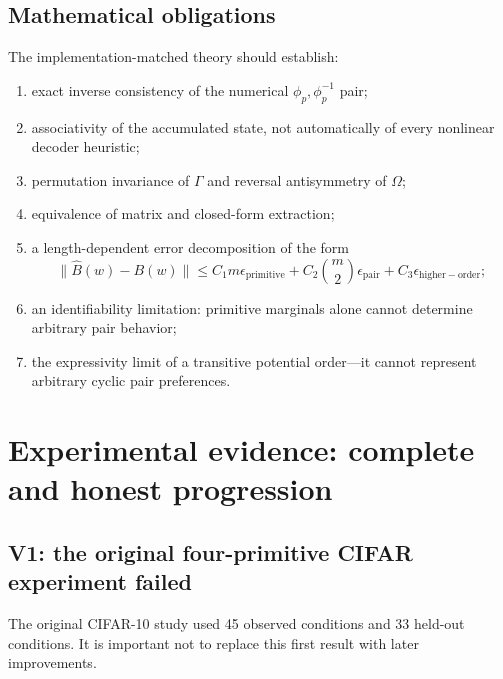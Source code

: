 \documentclass[11pt,a4paper]{article}
\begin{document}
\subsection{Mathematical obligations}

The implementation-matched theory should establish:
\begin{enumerate}
  \item exact inverse consistency of the numerical $\phi_p,\phi_p^{-1}$ pair;
  \item associativity of the accumulated state, not automatically of every
  nonlinear decoder heuristic;
  \item permutation invariance of $\Gamma$ and reversal antisymmetry of
  $\Omega$;
  \item equivalence of matrix and closed-form extraction;
  \item a length-dependent error decomposition of the form
  \[
  \|\widehat B(w)-B(w)\|
  \le C_1m\epsilon_{\mathrm{primitive}}
  +C_2\binom{m}{2}\epsilon_{\mathrm{pair}}
  +C_3\epsilon_{\mathrm{higher-order}};
  \]
  \item an identifiability limitation: primitive marginals alone cannot
  determine arbitrary pair behavior;
  \item the expressivity limit of a transitive potential order---it cannot
  represent arbitrary cyclic pair preferences.
\end{enumerate}

\section{Experimental evidence: complete and honest progression}

\subsection{V1: the original four-primitive CIFAR experiment failed}

The original CIFAR-10 study used 45 observed conditions and 33 held-out
conditions.  It is important not to replace this first result with later
improvements.
\end{document}
